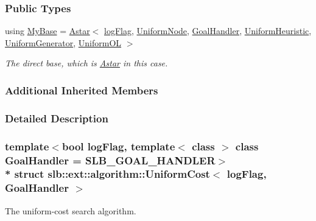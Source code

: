 \subsubsection*{Public Types}
\begin{DoxyCompactItemize}
\item 
using \hyperlink{structslb_1_1ext_1_1algorithm_1_1UniformCost_a5c5ed4ddf95cdeb811d15eb47f05bec3}{My\+Base} = \hyperlink{structslb_1_1ext_1_1algorithm_1_1Astar}{Astar}$<$ \hyperlink{structslb_1_1ext_1_1algorithm_1_1Algorithm_a614bd0faf9d0eba04f45bb204afac021}{log\+Flag}, \hyperlink{namespaceslb_1_1ext_1_1algorithm_a697c5839a166be7cc9cd7fc3c2b15f98}{Uniform\+Node}, \hyperlink{structslb_1_1ext_1_1algorithm_1_1Algorithm_ae0c6a75028107e4642e43798f21f4bfc}{Goal\+Handler}, \hyperlink{namespaceslb_1_1ext_1_1algorithm_a4df6bd68a037486451c16445cb78d21f}{Uniform\+Heuristic}, \hyperlink{namespaceslb_1_1ext_1_1algorithm_afe2eae9c2d224b1677a1e95c013c13b4}{Uniform\+Generator}, \hyperlink{namespaceslb_1_1ext_1_1algorithm_aebb91df5b56955857d898d76d9ca5873}{Uniform\+OL} $>$\hypertarget{structslb_1_1ext_1_1algorithm_1_1UniformCost_a5c5ed4ddf95cdeb811d15eb47f05bec3}{}\label{structslb_1_1ext_1_1algorithm_1_1UniformCost_a5c5ed4ddf95cdeb811d15eb47f05bec3}

\begin{DoxyCompactList}\small\item\em The direct base, which is \hyperlink{structslb_1_1ext_1_1algorithm_1_1Astar}{Astar} in this case. \end{DoxyCompactList}\end{DoxyCompactItemize}
\subsubsection*{Additional Inherited Members}


\subsubsection{Detailed Description}
\subsubsection*{template$<$bool log\+Flag, template$<$ class $>$ class Goal\+Handler = S\+L\+B\+\_\+\+G\+O\+A\+L\+\_\+\+H\+A\+N\+D\+L\+ER$>$\\*
struct slb\+::ext\+::algorithm\+::\+Uniform\+Cost$<$ log\+Flag, Goal\+Handler $>$}

The uniform-\/cost search algorithm. 


